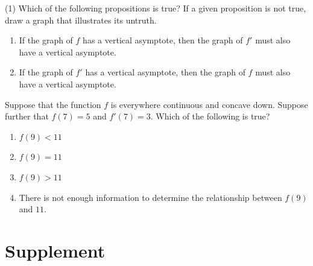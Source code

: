 \documentclass[12pt,]{book}
\newcommand{\lt}{<}
\newcommand{\gt}{>}
\theoremstyle{plain}
\theoremstyle{definition}
\numberwithin{equation}{section}
\newcommand{\fe}[2]{#1\mathopen{}\left(#2\right)\mathclose{}}
\newcommand{\fd}[1]{#1'}
\begin{document}
\begin{exercisegroup}(1)
\exercise[19.]\hypertarget{exercise-296}{\null}Which of the following propositions is true? If a given proposition is not true, draw a graph that illustrates its untruth.%
\begin{multicols}{2}
\begin{enumerate}[label=(\alph*)]
\item{}If the graph of \(f\) has a vertical asymptote, then the graph of \(\fd{f}\) must also have a vertical asymptote.\item{}If the graph of \(\fd{f}\) has a vertical asymptote, then the graph of \(f\) must also have a vertical asymptote.\end{enumerate}
\end{multicols}
\exercise[20.]\hypertarget{exercise-297}{\null}Suppose that the function \(f\) is everywhere continuous and concave down.  Suppose further that \(\fe{f}{7}=5\) and \(\fe{\fd{f}}{7}=3\).  Which of the following is true?%
\begin{multicols}{2}
\begin{enumerate}[label=(\alph*)]
\item{}\(\fe{f}{9}\lt11\)\item{}\(\fe{f}{9}=11\)\item{}\(\fe{f}{9}\gt11\)\item{}There is not enough information to determine the relationship between \(\fe{f}{9}\) and \(11\).\end{enumerate}
\end{multicols}
\end{exercisegroup}
\par\smallskip\noindent
\typeout{************************************************}
\typeout{************************************************}
\section[Supplement]{Supplement}\label{functions-derivatives-antiderivatives-supplementary-exercises}
\typeout{************************************************}
\typeout{************************************************}
\end{document}
